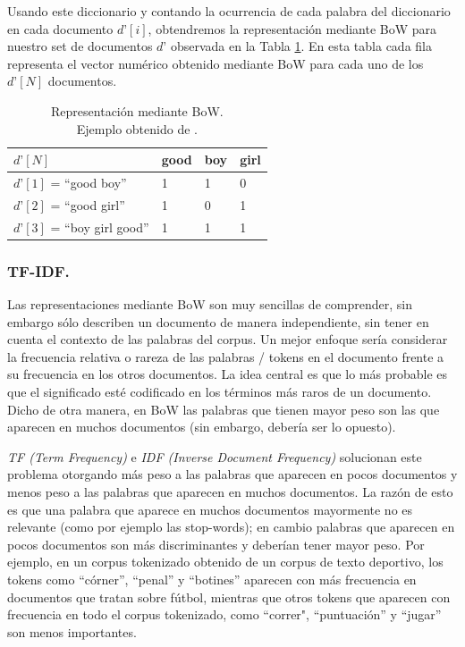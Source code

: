 \documentclass[12pt,a4paper]{article}
\begin{document}
\begin{sloppypar}
Usando este diccionario y contando la ocurrencia de cada palabra del diccionario en cada documento $d’[i]$, obtendremos la representación mediante BoW para nuestro set de documentos $d’$ observada en la Tabla \ref{table:bow_3}. En esta tabla cada fila representa el vector numérico obtenido mediante BoW para cada uno de los $d’[N]$ documentos.

\begin{table}[h!]
\centering
\begin{tabular}{|p{5cm}||p{1cm}|p{1cm}|p{1cm}|}
\hline
\centering $d’[N]$ & \textbf{good} & \textbf{boy} & \textbf{girl} \\ [1ex]
\hline
$d’[1]$ = ``good boy'' & 1 & 1 & 0 \\
\hline
$d’[2]$ = ``good girl'' & 1 & 0 & 1 \\
\hline
$d’[3]$ = ``boy girl good'' & 1 & 1 & 1 \\
\hline
\end{tabular}
\caption{Representación mediante BoW.\\ Ejemplo obtenido de \cite{NLP_2}.} 
\label{table:bow_3}
\end{table}

\subsubsection{TF-IDF.}\label{tf_idf}

Las representaciones mediante BoW son muy sencillas de comprender, sin embargo sólo describen un documento de manera independiente, sin tener en cuenta el contexto de las palabras del corpus. Un mejor enfoque sería considerar la frecuencia relativa o rareza de las palabras / tokens en el documento frente a su frecuencia en los otros documentos. La idea central es que lo más probable es que el significado esté codificado en los términos más raros de un documento. Dicho de otra manera, en BoW las palabras que tienen mayor peso son las que aparecen en muchos documentos (sin embargo, debería ser lo opuesto). 

\textit{TF (Term Frequency)} e \textit{IDF (Inverse Document Frequency)} solucionan este problema otorgando más peso a las palabras que aparecen en pocos documentos y menos peso a las palabras que aparecen en muchos documentos. La razón de esto es que una palabra que aparece en muchos documentos mayormente no es relevante (como por ejemplo las stop-words); en cambio palabras que aparecen en pocos documentos son más discriminantes y deberían tener mayor peso.  Por ejemplo, en un corpus tokenizado obtenido de un corpus de texto deportivo, los tokens como ``córner'', ``penal'' y ``botines'' aparecen con más frecuencia en documentos que tratan sobre fútbol, mientras que otros tokens que aparecen con frecuencia en todo el corpus tokenizado, como ``correr", ``puntuación'' y ``jugar'' son menos importantes\cite{NLP_7}.


\end{sloppypar}
\end{document}
